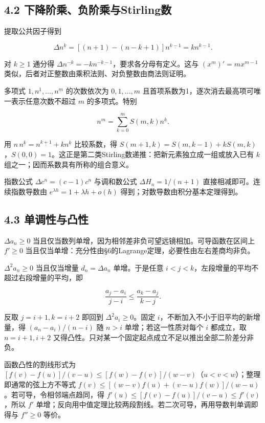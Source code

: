 \documentclass[11pt,a4paper]{article}
\begin{document}
\subsection{4.2
下降阶乘、负阶乘与Stirling数}\label{ux4e0bux964dux9636ux4e58ux8d1fux9636ux4e58ux4e0estirlingux6570}

提取公共因子得到

\[
\Delta n^{\underline k}
=[(n+1)-(n-k+1)]n^{\underline{k-1}}
=k n^{\underline{k-1}}.
\]

对 \(k\ge1\) 通分得
\(\Delta n^{\underline{-k}}=-k n^{\underline{-k-1}}\)，要求各分母有定义。这与
\((x^m)'=mx^{m-1}\) 类似，后者对正整数由乘积法则、对负整数由商法则证明。

多项式 \(1,n^{\underline1},\ldots,n^{\underline m}\) 的次数依次为
\(0,1,\ldots,m\) 且首项系数为1，逐次消去最高项可唯一表示任意次数不超过
\(m\) 的多项式。特别

\[
n^m=\sum_{k=0}^m S(m,k)n^{\underline k}.
\]

用 \(n\,n^{\underline k}=n^{\underline{k+1}}+k n^{\underline k}\)
比较系数，得
\(S(m+1,k)=S(m,k-1)+kS(m,k)\)，\(S(0,0)=1\)。这正是第二类Stirling数递推：把新元素独立成一组或放入已有
\(k\) 组之一；因而系数具有所称的组合意义。

指数公式 \(\Delta c^n=(c-1)c^n\) 与调和数公式 \(\Delta H_n=1/(n+1)\)
直接相减即可。连续指数导数由 \(e^{\lambda h}=1+\lambda h+o(h)\)
得到；对数导数由积分基本定理得到。

\subsection{4.3
单调性与凸性}\label{ux5355ux8c03ux6027ux4e0eux51f8ux6027}

\(\Delta a_n\ge0\)
当且仅当数列单增，因为相邻差非负可望远镜相加。可导函数在区间上
\(f'\ge0\)
当且仅当单增：充分性由§6的Lagrange定理，必要性由左右差商均非负。

\(\Delta^2a_n\ge0\) 当且仅当增量 \(d_n=\Delta a_n\) 单增。于是任意
\(i<j<k\)，左段增量的平均不超过右段增量的平均，即

\[
\frac{a_j-a_i}{j-i}\le\frac{a_k-a_j}{k-j}.\tag{4.3}
\]

反取 \(j=i+1,k=i+2\) 即回到 \(\Delta^2a_i\ge0\)。固定
\(i\)，不断加入不小于旧平均的新增量，得 \((a_n-a_i)/(n-i)\) 随 \(n>i\)
单增；若这一性质对每个 \(i\) 都成立，取 \(n=i+1,i+2\)
又得凸性。只对某一个固定起点成立不足以推出全部二阶差分非负。

函数凸性的割线形式为
\([f(v)-f(u)]/(v-u)\le[f(w)-f(v)]/(w-v)\)（\(u<v<w\)）；整理即通常的弦上方不等式
\(f(v)\le[(w-v)f(u)+(v-u)f(w)]/(w-u)\)。若可导，令相邻端点趋同，得
\(f'(u)\le[f(v)-f(u)]/(v-u)\le f'(v)\)，所以 \(f'\)
单增；反向用中值定理比较两段割线。若二次可导，再用导数判单调即得与
\(f''\ge0\) 等价。
\end{document}

